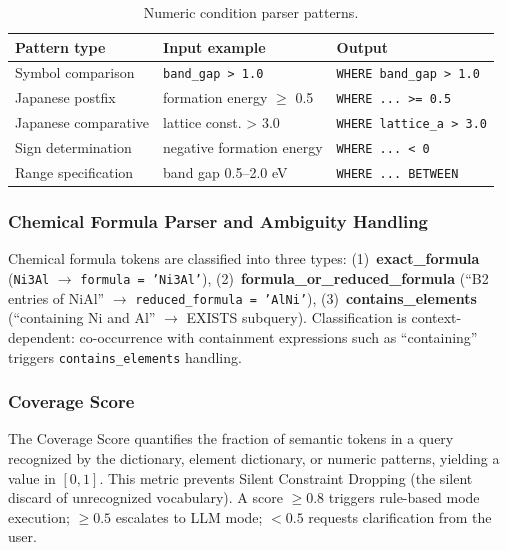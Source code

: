 \documentclass{npj-compt.mater}
\begin{document}
\begin{table}[t]
  \centering
  \caption{Numeric condition parser patterns.}
  \label{tab:numeric_patterns}
  \scriptsize
  \begin{tabular}{lll}
    \toprule
    Pattern type & Input example & Output \\
    \midrule
    Symbol comparison & \texttt{band\_gap > 1.0} & \texttt{WHERE band\_gap > 1.0} \\
    Japanese postfix & formation energy $\geq$ 0.5 & \texttt{WHERE ... >= 0.5} \\
    Japanese comparative & lattice const. > 3.0 & \texttt{WHERE lattice\_a > 3.0} \\
    Sign determination & negative formation energy & \texttt{WHERE ... < 0} \\
    Range specification & band gap 0.5--2.0 eV & \texttt{WHERE ... BETWEEN} \\
    \bottomrule
  \end{tabular}
\end{table}

\subsubsection{Chemical Formula Parser and Ambiguity Handling}

Chemical formula tokens are classified into three types:
(1)~\textbf{exact\_formula} (\texttt{Ni3Al} $\to$ \texttt{formula = 'Ni3Al'}),
(2)~\textbf{formula\_or\_reduced\_formula} (``B2 entries of NiAl'' $\to$
\texttt{reduced\_formula = 'AlNi'}),
(3)~\textbf{contains\_elements} (``containing Ni and Al'' $\to$ EXISTS subquery).
Classification is context-dependent: co-occurrence with containment
expressions such as ``containing'' triggers
\texttt{contains\_elements} handling.

\subsubsection{Coverage Score}
\label{sec:coverage_score}

The Coverage Score quantifies the fraction of semantic tokens in a query
recognized by the dictionary, element dictionary, or numeric patterns,
yielding a value in $[0, 1]$.
This metric prevents Silent Constraint Dropping (the silent discard of
unrecognized vocabulary).
A score $\geq 0.8$ triggers rule-based mode execution;
$\geq 0.5$ escalates to LLM mode;
$< 0.5$ requests clarification from the user.
\end{document}
